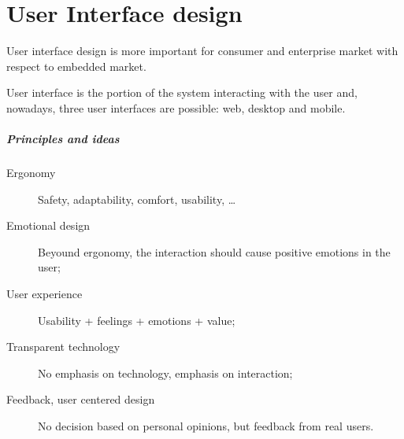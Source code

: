 \chapter{User Interface design}
User interface design is more important for consumer and enterprise market with respect to embedded market. 

User interface is the portion of the system interacting with the user and, nowadays, three user interfaces are possible: web, desktop and mobile.


\paragraph{Principles and ideas}
\begin{description}
\item [Ergonomy] Safety, adaptability, comfort, usability, \dots
\item [Emotional design] Beyound ergonomy, the interaction should cause positive emotions in the user;
\item [User experience] Usability + feelings + emotions + value;
\item [Transparent technology] No emphasis on technology, emphasis on interaction;
\item [Feedback, user centered design] No decision based on personal opinions, but feedback from real users.
\end{description}

